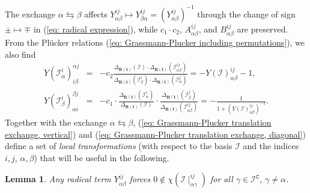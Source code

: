 \documentclass[10pt]{article}
\newtheorem{lem}{Lemma}%
\theoremstyle{remark}%
\theoremstyle{definition}%
\begin{document}
The exchange $\alpha\leftrightarrows\beta$ affects $Y_{\alpha\beta}^{ij}\mapsto Y_{\beta\alpha}^{ij}=(Y_{\alpha\beta}^{ij})^{-1}$ through the change of sign $\pm\mapsto\mp$ in (\ref{eq: radical expression}), 
while $c_{1}\cdot c_{2}$, $A_{\alpha\beta}^{ij}$, and $B_{\alpha\beta}^{ij}$ are preserved. 
From the Pl\"{u}cker relations (\ref{eq: Grassmann-Plucker including permutations}), we also find 
\begin{eqnarray}
Y(\mathcal{I}_{\alpha}^{i})_{i\beta}^{\alpha j} & = & -c_{2}\frac{\Delta_{\mathbf{R}(\mathbf{t})}(\mathcal{I})\cdot\Delta_{\mathbf{R}(\mathbf{t})}(\mathcal{I}_{\alpha\beta}^{ij})}{\Delta_{\mathbf{R}(\mathbf{t})}(\mathcal{I}_{\beta}^{i})\cdot\Delta_{\mathbf{R}(\mathbf{t})}(\mathcal{I}_{\alpha}^{j})}=-Y(\mathcal{I})_{\alpha\beta}^{ij}-1,\label{eq: Grassmann-Plucker translation exchange, vertical}\\
Y(\mathcal{I}_{\beta}^{i})_{\alpha i}^{\beta j} & = & -c_{1}\cdot\frac{\Delta_{\mathbf{R}(\mathbf{t})}(\mathcal{I}_{\alpha}^{i})}{\Delta_{\mathbf{R}(\mathbf{t})}(\mathcal{I})}\cdot\frac{\Delta_{\mathbf{R}(\mathbf{t})}(\mathcal{I}_{\beta}^{j})}{\Delta_{\mathbf{R}(\mathbf{t})}(\mathcal{I}_{\alpha\beta}^{ij})}=-\frac{1}{1+\left(Y(\mathcal{I})_{\alpha\beta}^{ij}\right)^{-1}}.
\label{eq: Grassmann-Plucker translation exchange, diagonal}
\end{eqnarray}
Together with the exchange $\alpha\leftrightarrows\beta$, (\ref{eq: Grassmann-Plucker translation exchange, vertical}) and (\ref{eq: Grassmann-Plucker translation exchange, diagonal}) define a set of \emph{local transformations} (with respect to the basis $\mathcal{I}$ and the indices $i,j$, $\alpha,\beta$) that will be useful in the following. 
\begin{lem}
\label{lem: observable sets with 0 are algebraic}
Any radical term $Y_{\alpha\beta}^{ij}$ forces $0\notin\chi(\mathcal{I}\mid_{\alpha\gamma}^{ij})$ for all $\gamma\in\mathcal{I}^{\mathtt{C}}$, $\gamma\neq \alpha$. 
\end{lem}
\end{document}
